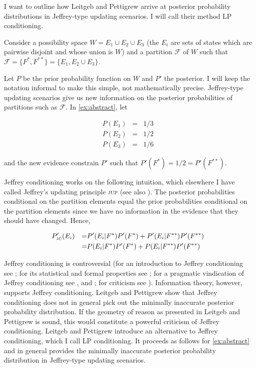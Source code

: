 \documentclass[11pt]{article}
\begin{document}
I want to outline how Leitgeb and Pettigrew arrive at posterior
probability distributions in Jeffrey-type updating scenarios. I will
call their method LP conditioning.

\begin{quotex}
  \label{ex:abstract} Consider a possibility
  space $W=E_{1}\cup{}E_{2}\cup{}E_{3}$ (the $E_{i}$ are sets of
  states which are pairwise disjoint and whose union is $W$) and a
  partition $\mathcal{F}$ of $W$ such that
  $\mathcal{F}=\{F^{*},F^{**}\}=\{E_{1},E_{2}\cup{}E_{3}\}$.
\end{quotex}

Let $P$ be the prior probability function on $W$ and $P'$ the
posterior. I will keep the notation informal to make this simple, not
mathematically precise. Jeffrey-type updating scenarios give us new
information on the posterior probabilities of partitions such as
$\mathcal{F}$. In {\xample} \ref{ex:abstract}, let

\begin{equation}
  \label{eq:priors}
  \begin{array}{rcl}
    P(E_{1})&=&1/3 \\
    P(E_{2})&=&1/2 \\
    P(E_{3})&=&1/6
  \end{array}
\end{equation}

and the new evidence constrain $P'$ such that
$P'(F^{*})=1/2=P'(F^{**})$.

Jeffrey conditioning works on the following intuition, which elsewhere
I have called Jeffrey's updating principle \textsc{jup} (see also
). The posterior probabilities conditional on the
partition elements equal the prior probabilities conditional on the
partition elements since we have no information in the evidence that
they should have changed. Hence,

\begin{align}
  \label{eq:jc}
  &P'_{\mbox{\tiny JC}}(E_{i})&=&P'(E_{i}|F^{*})P'(F^{*})+P'(E_{i}|F^{**})P'(F^{**})\notag \\
  &&=&P(E_{i}|F^{*})P'(F^{*})+P(E_{i}|F^{**})P'(F^{**})
\end{align}

Jeffrey conditioning is controversial (for an introduction to Jeffrey
conditioning see ; for its statistical and
formal properties see ; for a pragmatic
vindication of Jeffrey conditioning see , and
; for criticism see
). Information theory, however, supports
Jeffrey conditioning. Leitgeb and Pettigrew show that Jeffrey
conditioning does not in general pick out the minimally inaccurate
posterior probability distribution. If the geometry of reason as
presented in Leitgeb and Pettigrew is sound, this would constitute a
powerful criticism of Jeffrey conditioning. Leitgeb and Pettigrew
introduce an alternative to Jeffrey conditioning, which I call LP
conditioning. It proceeds as follows for {\xample} \ref{ex:abstract}
and in general provides the minimally inaccurate posterior probability
distribution in Jeffrey-type updating scenarios.
\end{document}
